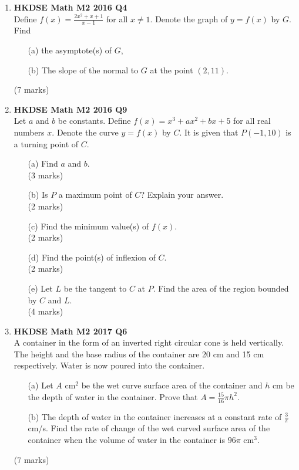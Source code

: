 \documentclass{report}
\begin{document}
\begin{enumerate}
	\item \textbf{HKDSE Math M2 2016 Q4}\\
	Define $f(x) = \displaystyle\frac{2x^2 + x + 1}{x - 1}$ for all $x \neq 1$. Denote the graph of $y = f(x)$ by $G$. Find 
	\begin{enumerate}
		\item [(a)]the asymptote(s) of $G$,
		\item [(b)]The slope of the normal to $G$ at the point $(2,11)$.
	\end{enumerate}
	(7 marks)

	\item \textbf{HKDSE Math M2 2016 Q9}\\
	Let $a$ and $b$ be constants. Define $f(x) = x^3 + ax^2 + bx + 5$ for all real numbers $x$. Denote the curve $y = f(x)$ by $C$. It is given that $P(-1,10)$ is a turning point of $C$.
	\begin{enumerate}
		\item [(a)]Find $a$ and $b$.\\(3 marks)
		\item [(b)]Is $P$ a maximum point of $C$? Explain your answer. \\(2 marks)
		\item [(c)]Find the minimum value(s) of $f(x)$. \\(2 marks)
		\item [(d)]Find the point(s) of inflexion of $C$. \\(2 marks)
		\item [(e)]Let $L$ be the tangent to $C$ at $P$. Find the area of the region bounded by $C$ and $L$. \\(4 marks)
	\end{enumerate}

	\newpage

	\item \textbf{HKDSE Math M2 2017 Q6}\\
	A container in the form of an inverted right circular cone is held vertically. The height and the base radius of the container are 20 cm and 15 cm respectively. Water is now poured into the container.
	\begin{enumerate}
		\item [(a)]Let $A$ cm$^2$ be the wet curve surface area of the container and $h$ cm be the depth of water in the container. Prove that $\displaystyle A = \frac{15}{16}\pi h^2$. 
		\item [(b)]The depth of water in the container increases at a constant rate of $\displaystyle\frac{3}{\pi}$ cm/s. Find the rate of change of the wet curved surface area of the container when the volume of water in the container is $96 \pi$ cm$^3$.
	\end{enumerate}
	(7 marks)


\end{enumerate}
\end{document}
